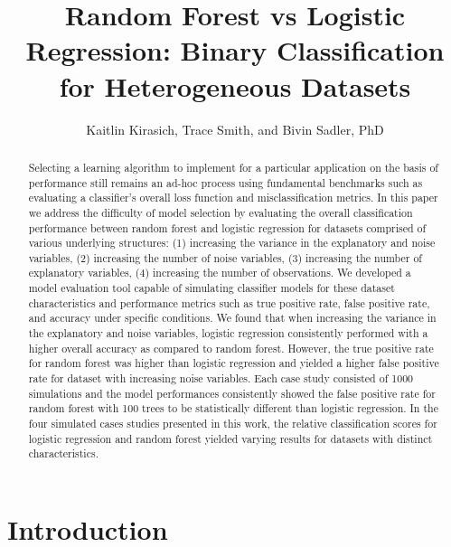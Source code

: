\documentclass{llncs}
\title{\textbf{Random Forest vs Logistic Regression: Binary Classification for Heterogeneous Datasets}}
\author{Kaitlin Kirasich, Trace Smith, and Bivin Sadler, PhD}
\institute{Master of Science in Data Science \\ Southern Methodist University \\ Dallas, Texas USA \\
\email{\{kkirasich,traces,bsadler\}@smu.edu}}
\begin{document}
\maketitle

\begin{abstract} 
Selecting a learning algorithm to implement for a particular application on the basis of performance still remains an ad-hoc process using fundamental benchmarks such as evaluating a classifier’s overall loss function and misclassification metrics. In this paper we address the difficulty of model selection by evaluating the overall classification performance between random forest and logistic regression for datasets comprised of various underlying structures: (1) increasing the variance in the explanatory and noise variables, (2) increasing the number of noise variables, (3) increasing the number of explanatory variables, (4) increasing the number of observations. We developed a model evaluation tool capable of simulating classifier models for these dataset characteristics and performance metrics such as true positive rate, false positive rate, and accuracy under specific conditions. We found that when increasing the variance in the explanatory and noise variables, logistic regression consistently performed with a higher overall accuracy as compared to random forest. However, the true positive rate for random forest was higher than logistic regression and yielded a higher false positive rate for dataset with increasing noise variables. Each case study consisted of 1000 simulations and the model performances consistently showed the false positive rate for random forest with 100 trees to be statistically different than logistic regression. In the four simulated cases studies presented in this work, the relative classification scores for logistic regression and random forest yielded varying results for datasets with distinct characteristics.
\end{abstract}

\section{Introduction}
\end{document}
